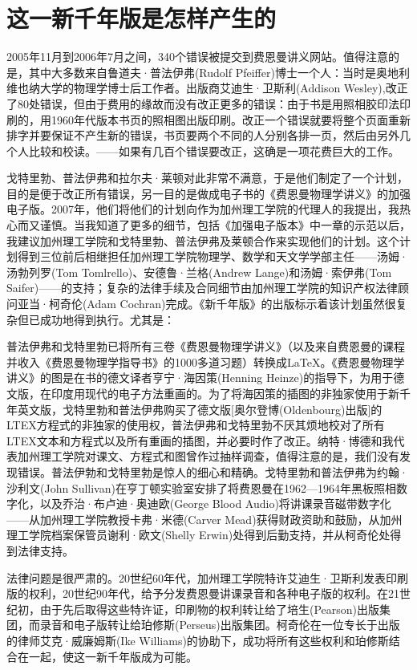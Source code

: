 \documentclass[UTF8, 12pt, a4paper, twoside]{ctexbook}
\begin{document}
\section*{这一新千年版是怎样产生的}

2005年11月到2006年7月之间，340个错误被提交到费恩曼讲义网站。值得注意的是，其中大多数来自鲁道夫·普法伊弗(Rudolf Pfeiffer)博士一个人：当时是奥地利维也纳大学的物理学博士后工作者。出版商艾迪生·卫斯利(Addison Wesley),改正了80处错误，但由于费用的缘故而没有改正更多的错误：由于书是用照相胶印法印刷的，用1960年代版本书页的照相图出版印刷。改正一个错误就要将整个页面重新排字并要保证不产生新的错误，书页要两个不同的人分别各排一页，然后由另外几个人比较和校读。——如果有几百个错误要改正，这确是一项花费巨大的工作。

戈特里勃、普法伊弗和拉尔夫·莱顿对此非常不满意，于是他们制定了一个计划，目的是便于改正所有错误，另一目的是做成电子书的《费恩曼物理学讲义》的加强电子版。2007年，他们将他们的计划向作为加州理工学院的代理人的我提出，我热心而又谨慎。当我知道了更多的细节，包括《加强电子版本》中一章的示范以后，我建议加州理工学院和戈特里勃、普法伊弗及莱顿合作来实现他们的计划。这个计划得到三位前后相继担任加州理工学院物理学、数学和天文学学部主任——汤姆·汤勃列罗(Tom Tomlrello)、安德鲁·兰格(Andrew Lange)和汤姆·索伊弗(Tom Saifer)——的支持；复杂的法律手续及合同细节由加州理工学院的知识产权法律顾问亚当·柯奇伦(Adam Cochran)完成。《新千年版》的出版标示着该计划虽然很复杂但已成功地得到执行。尤其是：

普法伊弗和戈特里勃已将所有三卷《费恩曼物理学讲义》（以及来自费恩曼的课程并收入《费恩曼物理学指导书》的1000多道习题）转换成\LaTeX。《费恩曼物理学讲义》的图是在书的德文译者亨宁·海因策(Henning Heinze)的指导下，为用于德文版，在印度用现代的电子方法重画的。为了将海因策的插图的非独家使用于新千年英文版，戈特里勃和普法伊弗购买了德文版[奥尔登博(Oldenbourg)出版]的LTEX方程式的非独家的使用权，普法伊弗和戈特里勃不厌其烦地校对了所有LTEX文本和方程式以及所有重画的插图，并必要时作了改正。纳特·博德和我代表加州理工学院对课文、方程式和图曾作过抽样调查，值得注意的是，我们没有发现错误。普法伊勃和戈特里勃是惊人的细心和精确。戈特里勃和普法伊弗为约翰·沙利文(John Sullivan)在亨丁顿实验室安排了将费恩曼在1962—1964年黑板照相数字化，以及乔治·布卢迪·奥迪欧(George Blood Audio)将讲课录音磁带数字化——从加州理工学院教授卡弗·米德(Carver Mead)获得财政资助和鼓励，从加州理工学院档案保管员谢利·欧文(Shelly Erwin)处得到后勤支持，并从柯奇伦处得到法律支持。

法律问题是很严肃的。20世纪60年代，加州理工学院特许艾迪生·卫斯利发表印刷版的权利，20世纪90年代，给予分发费恩曼讲课录音和各种电子版的权利。在21世纪初，由于先后取得这些特许证，印刷物的权利转让给了培生(Pearson)出版集团，而录音和电子版转让给珀修斯(Perseus)出版集团。柯奇伦在一位专长于出版的律师艾克·威廉姆斯(Ike Williams)的协助下，成功将所有这些权利和珀修斯结合在一起，使这一新千年版成为可能。
\end{document}
